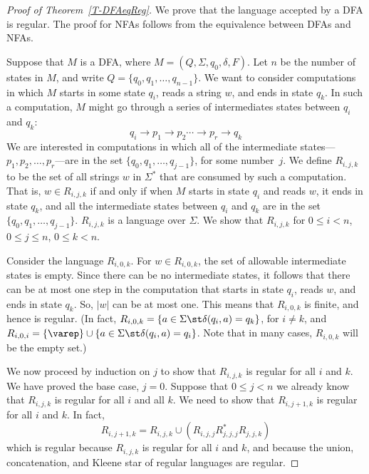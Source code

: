 \begin{proof}[Proof of Theorem~\ref{T-DFAeqReg}]
We prove that the language accepted by a DFA is regular.  The proof for NFAs
follows from the equivalence between DFAs and NFAs.

Suppose that $M$ is a DFA, where $M=(Q,\Sigma,q_0,\delta,F)$.  Let $n$ be the
number of states in $M$, and write $Q=\{q_0,q_1,\dots,q_{n-1}\}$.  We want
to consider computations in which $M$ starts in some state $q_i$, reads a string
$w$, and ends in state $q_k$.  In such a computation, $M$ might go through a
series of intermediates states between $q_i$ and $q_k$:
$$q_i\longrightarrow p_1\longrightarrow p_2 \cdots\longrightarrow p_r\longrightarrow q_k$$
We are interested in computations in which all of the intermediate states---$p_1,p_2,\dots,p_r$---are
in the set $\{q_0,q_1,\dots,q_{j-1}\}$, for some number~$j$.
We define $R_{i,j,k}$ to be the set of all strings $w$ in $\Sigma^*$ that are consumed
by such a computation.  That is, $w\in R_{i,j,k}$ if and only if when $M$ starts in state
$q_i$ and reads $w$, it ends in state $q_k$, and all the intermediate states between
$q_i$ and $q_k$ are in the set $\{q_0,q_1,\dots,q_{j-1}\}$.
$R_{i,j,k}$ is a language over $\Sigma$.  We show that $R_{i,j,k}$ for
$0\le i < n$, $0\le j \le n$, $0\le k < n$.

Consider the language $R_{i,0,k}$.  For $w\in R_{i,0,k}$, the set of allowable intermediate
states is empty.  Since there can be no intermediate states,
it follows that there can be at most one step in the computation that
starts in state $q_i$, reads $w$, and ends in state $q_k$.  So, $|w|$ can be at most one.
This means that $R_{i,0,k}$ is finite, and hence is regular.  (In fact,
$R_{i,0,k}=\{a\in\Sigma\st \delta(q_i,a)=q_k\}$, for $i\ne k$, and
$R_{i,0,i}=\{\varep\}\cup\{a\in\Sigma\st \delta(q_i,a)=q_i\}$.  Note that in many
cases, $R_{i,0,k}$ will be the empty set.)

We now proceed by induction on $j$ to show that $R_{i,j,k}$ is regular for all $i$ and $k$.
We have proved the base case, $j=0$.  Suppose that $0\le j< n$ we already know that $R_{i,j,k}$
is regular for all $i$ and all $k$.  We need to show that $R_{i,j+1,k}$ is regular for all $i$ and $k$.
In fact, 
$$R_{i,j+1,k}=R_{i,j,k}\cup \left( R_{i,j,j}R_{j,j,j}^*R_{j,j,k}\right)$$
which is regular because $R_{i,j,k}$ is regular for all $i$ and $k$, and because the union, concatenation,
and Kleene star of regular languages are regular.


\end{proof}
